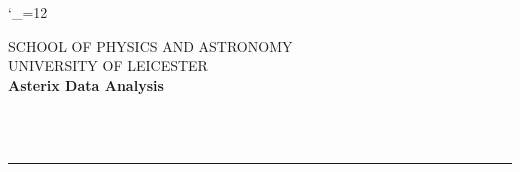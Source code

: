 \newcommand {\manparameterentry}[3]{\manparameterzss\gdef\manparameterzss{\\}%
\gdef\manparameterzhl{\hline}\manparameterorder{#1}{#2}{#3}}



\newenvironment {manenumerate}{\begin{enumerate}}{\end{enumerate}}

\newcommand {\manenumerateitem}[1]{\item [#1]}

\newenvironment {manitemize}{\begin{itemize}}{\end{itemize}}

\newcommand {\manitemizeitem}{\item}

\newenvironment {mandescription}{\begin{description}\begin{description}}%
{\end{description}\end{description}}

\newcommand {\mandescriptionitem}[1]{\item [#1]}

\newcommand {\mantt}{\tt}

\newcommand {\manheadstyle}{}

\catcode`\_=12
\def\cha{{$\langle c1 \rangle$}}
\def\chb{{$\langle c2 \rangle$}}
\def\rornum{{$\langle nnnnnn \rangle$}}
\def\RPF{{$R \langle P/F \rangle$}}
\def\RH{{\it RH}}
\def\RP{{\it RP}}


\newcommand{\halfpfig}[1]{
\setlength{\unitlength}{1in}
\begin{picture}(5.0,5.0)
\put(0,5.0){\special{include #1}}
\typeout{#1 inserted on page \arabic{page}}
\end{picture}
}



\thispagestyle{empty}
SCHOOL OF PHYSICS AND ASTRONOMY \hfill \stardocname\\
UNIVERSITY OF LEICESTER\\
{\large\bf Asterix Data Analysis\\}
{\large\bf \stardoccategory\ \stardocnumber}
\begin{flushright}
\stardocauthors\\
\stardocdate
\end{flushright}
\vspace{-4mm}
\rule{\textwidth}{0.5mm}
\vspace{5mm}
\begin{center}
{\Large\bf \stardoctitle}
\end{center}
\vspace{5mm}

